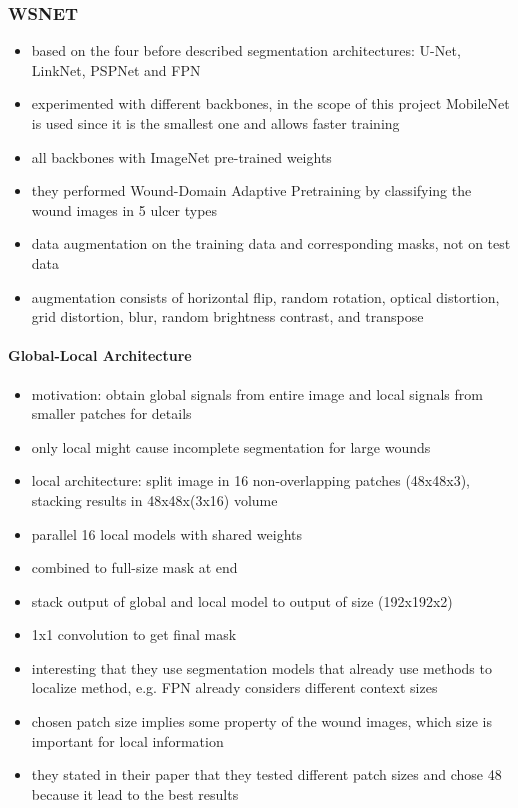 \subsubsection{WSNET}

\begin{itemize}
	\item based on the four before described segmentation architectures: U-Net, LinkNet, PSPNet and FPN
	\item experimented with different backbones, in the scope of this project MobileNet \cite{howard2017mobilenets} is used since it is the smallest one and allows faster training
	\item all backbones with ImageNet pre-trained weights
	\item they performed Wound-Domain Adaptive Pretraining by classifying the wound images in 5 ulcer types
	\item data augmentation on the training data and corresponding masks, not on test data
	\item augmentation consists of horizontal flip, random rotation, optical distortion, grid distortion, blur, random brightness contrast, and transpose
\end{itemize}

\paragraph{Global-Local Architecture}

\begin{itemize}
	\item motivation: obtain global signals from entire image and local signals from smaller patches for details
	\item only local might cause incomplete segmentation for large wounds
	\item local architecture: split image in 16 non-overlapping patches (48x48x3), stacking results in 48x48x(3x16) volume
	\item parallel 16 local models with shared weights
	\item combined to full-size mask at end
	\item stack output of global and local model to output of size (192x192x2)
	\item 1x1 convolution to get final mask
\end{itemize}

\begin{itemize}
	\item interesting that they use segmentation models that already use methods to localize method, e.g. FPN already considers different context sizes
	\item chosen patch size implies some property of the wound images, which size is important for local information
	\item they stated in their paper that they tested different patch sizes and chose 48 because it lead to the best results
\end{itemize}


